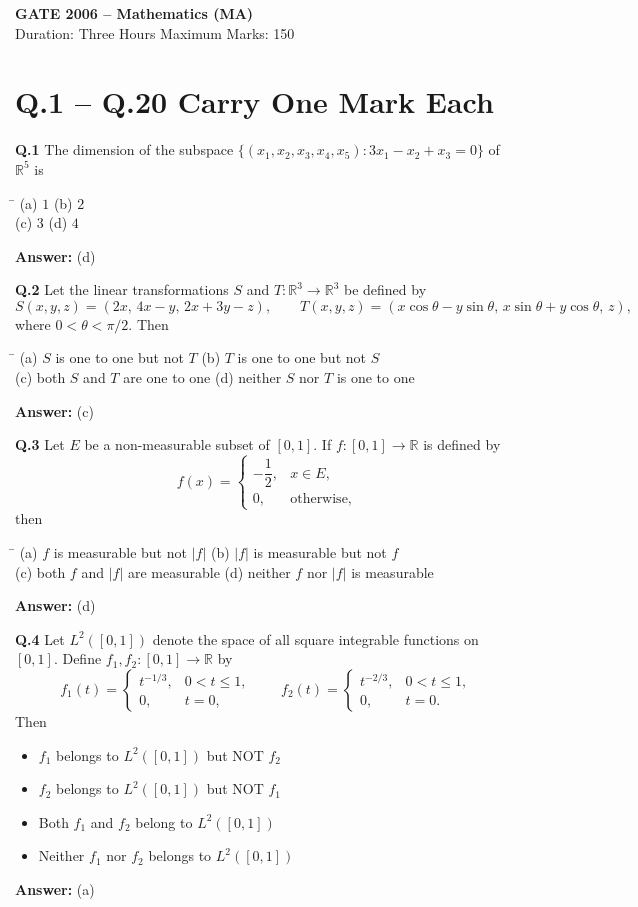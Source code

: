 \documentclass[11pt,a4paper]{article}
\newcommand{\optsfour}[4]{%
  \begin{tabbing}
    \hspace{0.48\linewidth}\=\kill
    (a) #1 \> (b) #2 \\[2pt]
    (c) #3 \> (d) #4
  \end{tabbing}%
}
\newcommand{\optslist}[4]{%
  \begin{itemize}
    \setlength{\itemsep}{2pt}\setlength{\parskip}{0pt}
    \item[(a)] #1
    \item[(b)] #2
    \item[(c)] #3
    \item[(d)] #4
  \end{itemize}%
}
\newcommand{\ans}[1]{\textbf{Answer:} #1\par\medskip}
\begin{document}

\begin{center}
  {\Large\bfseries GATE 2006 -- Mathematics (MA)}\\[4pt]
  {\small Duration: Three Hours \quad\textbar\quad Maximum Marks: 150}
\end{center}

\section*{Q.1 -- Q.20 Carry One Mark Each}

\textbf{Q.1} The dimension of the subspace $\{(x_1, x_2, x_3, x_4, x_5) : 3x_1 - x_2 + x_3 = 0\}$ of $\mathbb{R}^5$ is
\optsfour{$1$}{$2$}{$3$}{$4$}
\ans{(d)}

\textbf{Q.2} Let the linear transformations $S$ and $T : \mathbb{R}^3 \to \mathbb{R}^3$ be defined by
\[
  S(x,y,z) = (2x,\, 4x - y,\, 2x + 3y - z), \qquad T(x,y,z) = (x\cos\theta - y\sin\theta,\, x\sin\theta + y\cos\theta,\, z),
\]
where $0 < \theta < \pi/2$. Then
\optsfour{$S$ is one to one but not $T$}{$T$ is one to one but not $S$}{both $S$ and $T$ are one to one}{neither $S$ nor $T$ is one to one}
\ans{(c)}

\textbf{Q.3} Let $E$ be a non-measurable subset of $[0, 1]$. If $f : [0, 1] \to \mathbb{R}$ is defined by
\[
  f(x) = \begin{cases} -\dfrac{1}{2}, & x \in E, \\ 0, & \text{otherwise}, \end{cases}
\]
then
\optsfour{$f$ is measurable but not $|f|$}{$|f|$ is measurable but not $f$}{both $f$ and $|f|$ are measurable}{neither $f$ nor $|f|$ is measurable}
\ans{(d)}

\textbf{Q.4} Let $L^2([0,1])$ denote the space of all square integrable functions on $[0, 1]$. Define $f_1, f_2 : [0, 1] \to \mathbb{R}$ by
\[
  f_1(t) = \begin{cases} t^{-1/3}, & 0 < t \le 1, \\ 0, & t = 0, \end{cases}
  \qquad
  f_2(t) = \begin{cases} t^{-2/3}, & 0 < t \le 1, \\ 0, & t = 0. \end{cases}
\]
Then
\optslist{$f_1$ belongs to $L^2([0,1])$ but NOT $f_2$}{$f_2$ belongs to $L^2([0,1])$ but NOT $f_1$}{Both $f_1$ and $f_2$ belong to $L^2([0,1])$}{Neither $f_1$ nor $f_2$ belongs to $L^2([0,1])$}
\ans{(a)}
\end{document}
